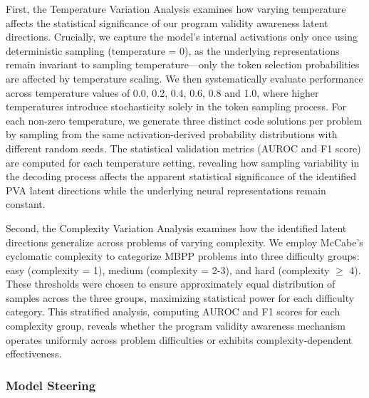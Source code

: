 \documentclass[11pt]{article}
\begin{document}
First, the Temperature Variation Analysis examines how varying temperature affects the statistical significance of our program validity awareness latent directions. Crucially, we capture the model's internal activations only once using deterministic sampling (temperature = 0), as the underlying representations remain invariant to sampling temperature—only the token selection probabilities are affected by temperature scaling. We then systematically evaluate performance across temperature values of 0.0, 0.2, 0.4, 0.6, 0.8 and 1.0, where higher temperatures introduce stochasticity solely in the token sampling process. For each non-zero temperature, we generate three distinct code solutions per problem by sampling from the same activation-derived probability distributions with different random seeds. The statistical validation metrics (AUROC and F1 score) are computed for each temperature setting, revealing how sampling variability in the decoding process affects the apparent statistical significance of the identified PVA latent directions while the underlying neural representations remain constant.

Second, the Complexity Variation Analysis examines how the identified latent directions generalize across problems of varying complexity. We employ McCabe's cyclomatic complexity \citep{mccabe1976complexity} to categorize MBPP problems into three difficulty groups: easy (complexity = 1), medium (complexity = 2-3), and hard (complexity $\geq$ 4). These thresholds were chosen to ensure approximately equal distribution of samples across the three groups, maximizing statistical power for each difficulty category. This stratified analysis, computing AUROC and F1 scores for each complexity group, reveals whether the program validity awareness mechanism operates uniformly across problem difficulties or exhibits complexity-dependent effectiveness.

\subsubsection{Model Steering}
\end{document}
